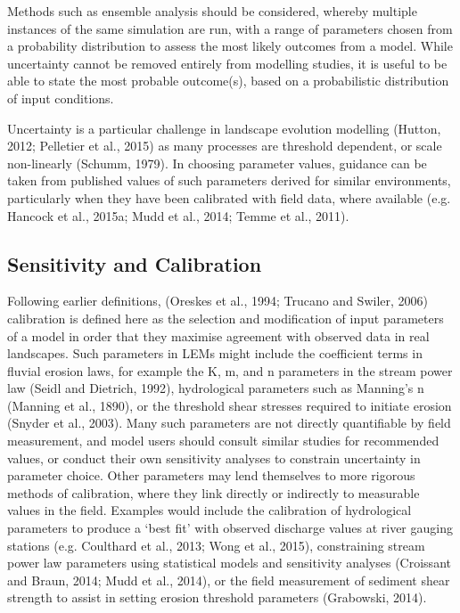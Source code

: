 Methods such as ensemble analysis should be considered, whereby multiple instances of the same simulation are run, with a range of parameters chosen from a probability distribution to assess the most likely outcomes from a model. While uncertainty cannot be removed entirely from modelling studies, it is useful to be able to state the most probable outcome(s), based on a probabilistic distribution of input conditions.

Uncertainty is a particular challenge in landscape evolution modelling (Hutton, 2012; Pelletier et al., 2015) as many processes are threshold dependent, or scale non-linearly (Schumm, 1979). In choosing parameter values, guidance can be taken from published values of such parameters derived for similar environments, particularly when they have been calibrated with field data, where available (e.g. Hancock et al., 2015a; Mudd et al., 2014; Temme et al., 2011).

\subsection{Sensitivity and Calibration}
Following earlier definitions, (Oreskes et al., 1994; Trucano and Swiler, 2006) calibration is defined here as the selection and modification of input parameters of a model in order that they maximise agreement with observed data in real landscapes. Such parameters in LEMs might include the coefficient terms in fluvial erosion laws, for example the K, m, and n parameters in the stream power law (Seidl and Dietrich, 1992), hydrological parameters such as Manning's n (Manning et al., 1890), or the threshold shear stresses required to initiate erosion (Snyder et al., 2003). Many such parameters are not directly quantifiable by field measurement, and model users should consult similar studies for recommended values, or conduct their own sensitivity analyses to constrain uncertainty in parameter choice. Other parameters may lend themselves to more rigorous methods of calibration, where they link directly or indirectly to measurable values in the field. Examples would include the calibration of hydrological parameters to produce a `best fit' with observed discharge values at river gauging stations (e.g. Coulthard et al., 2013; Wong et al., 2015), constraining stream power law parameters using statistical models and sensitivity analyses (Croissant and Braun, 2014; Mudd et al., 2014), or the field measurement of sediment shear strength to assist in setting erosion threshold parameters (Grabowski, 2014).

